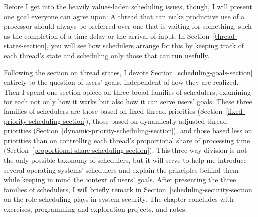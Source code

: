 Before I get into the heavily values-laden scheduling issues, though,
I will present one goal everyone can agree upon:  A thread that can
make productive use of a processor should always be preferred over one
that is waiting for something, such as the completion of a time delay
or the arrival of input.  In Section~\ref{thread-states-section}, you will see how
schedulers arrange for this by keeping track of each thread's state
and scheduling only those that can run usefully.

Following the section on thread states, I devote Section~\ref{scheduling-goals-section} entirely
to the question of users' goals, independent of how they are realized.
Then I spend one section apiece on three broad families of
schedulers, examining for each not only how it works but also how it
can serve users' goals.  These three families of schedulers are those
based on fixed thread priorities (Section~\ref{fixed-priority-scheduling-section}), those based on dynamically adjusted
thread priorities (Section~\ref{dynamic-priority-scheduling-section}), and those based less on priorities than on
controlling each thread's proportional share of processing time (Section~\ref{proportional-share-scheduling-section}).  This three-way division
is not the only possible taxonomy of schedulers, but it will serve to
help me introduce several operating systems' schedulers and
explain the principles behind them while keeping in mind the context
of users' goals.  After presenting the three families of schedulers, I
will briefly remark in Section~\ref{scheduling-security-section} on the role scheduling plays in system security.  The chapter concludes
with exercises,
programming and exploration projects, and notes.

